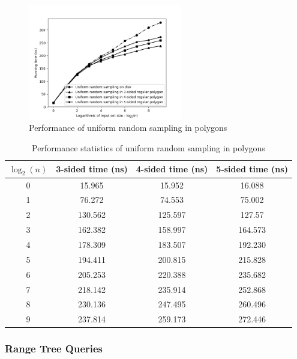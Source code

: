 \documentclass{article}
\begin{document}
\begin{figure}[h!]
    \includegraphics[width=0.6\textwidth]{uniform_polygon_input}
    \caption{Performance of uniform random sampling in polygons}
    \label{fig:uniform_polygon_input}
\end{figure}

\begin{table}[h!]
    \begin{tabular}{cccc}
        $\log_2(n)$ & 3-sided time (ns) & 4-sided time (ns) & 5-sided time (ns) \\
        \hline
        0 & 15.965 & 15.952 & 16.088 \\
        1 & 76.272 & 74.553 & 75.002 \\
        2 & 130.562 & 125.597 & 127.57 \\
        3 & 162.382 & 158.997 & 164.573 \\
        4 & 178.309 & 183.507 & 192.230 \\
        5 & 194.411 & 200.815 & 215.828 \\
        6 & 205.253 & 220.388 & 235.682 \\
        7 & 218.142 & 235.914 & 252.868 \\
        8 & 230.136 & 247.495 & 260.496 \\
        9 & 237.814 & 259.173 & 272.446
    \end{tabular}
    \caption{Performance statistics of uniform random sampling in polygons}
    \label{tab:uniform_polygon_input}
\end{table}

\subsubsection{Range Tree Queries}
\end{document}
